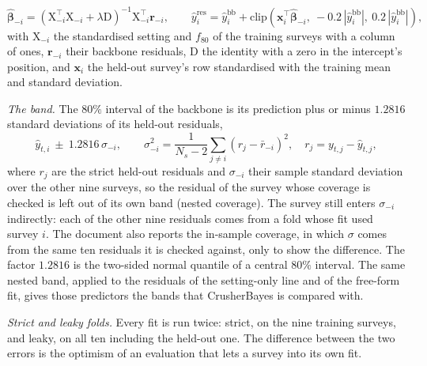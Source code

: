 \begin{equation}
\hat{\boldsymbol\beta}_{-i}=\left(\mathrm X_{-i}^{\top}\mathrm X_{-i}+\lambda\mathrm D\right)^{-1}\mathrm X_{-i}^{\top}\mathbf r_{-i},\qquad
\hat y^{\mathrm{res}}_{i} = \hat y^{\mathrm{bb}}_{i} + \mathrm{clip}\!\left(\mathbf x_i^{\top}\hat{\boldsymbol\beta}_{-i},\ -0.2\,|\hat y^{\mathrm{bb}}_{i}|,\ 0.2\,|\hat y^{\mathrm{bb}}_{i}|\right),
\label{eq:ridge}
\end{equation}
with $\mathrm X_{-i}$ the standardised setting and $f_{80}$ of the training surveys with a column of ones, $\mathbf r_{-i}$ their backbone
residuals, $\mathrm D$ the identity with a zero in the intercept's position, and $\mathbf x_i$ the held-out survey's row standardised with the
training mean and standard deviation.

\emph{The band.} The $80\%$ interval of the backbone is its prediction plus or minus $1.2816$ standard deviations of its held-out residuals,
\begin{equation}
\hat y_{t,i}\ \pm\ 1.2816\,\sigma_{-i},\qquad
\sigma_{-i}^2 = \frac{1}{N_s-2}\sum_{j\ne i}\left(r_j - \bar r_{-i}\right)^2,\quad r_j = y_{t,j} - \hat y_{t,j},
\label{eq:band}
\end{equation}
where $r_j$ are the strict held-out residuals and $\sigma_{-i}$ their sample standard deviation over the other nine surveys, so the residual of
the survey whose coverage is checked is left out of its own band (nested coverage). The survey still enters $\sigma_{-i}$ indirectly: each of the
other nine residuals comes from a fold whose fit used survey $i$. The document also reports the in-sample coverage, in which $\sigma$ comes
from the same ten residuals it is checked against, only to show the difference. The factor $1.2816$ is the two-sided normal quantile of a central
$80\%$ interval. The same nested band, applied to the residuals of the setting-only line and of the free-form fit, gives those predictors the bands
that CrusherBayes is compared with.

\emph{Strict and leaky folds.} Every fit is run twice: strict, on the nine training surveys, and leaky, on all ten including the held-out one. The
difference between the two errors is the optimism of an evaluation that lets a survey into its own fit.

